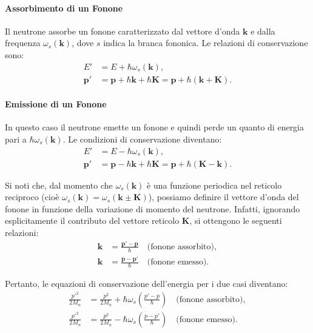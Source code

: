 \paragraph{Assorbimento di un Fonone}
Il neutrone assorbe un fonone caratterizzato dal vettore d'onda $\mathbf{k}$ e dalla frequenza $\omega_s(\mathbf{k})$, dove $s$ indica la branca fononica. Le relazioni di conservazione sono:
\[
\begin{split}
E' &= E + \hbar \omega_s(\mathbf{k}), \\
\mathbf{p}' &= \mathbf{p} + \hbar \mathbf{k} + \hbar \mathbf{K} = \mathbf{p} + \hbar \left( \mathbf{k} + \mathbf{K} \right).
\end{split}
\]

\paragraph{Emissione di un Fonone}
In questo caso il neutrone emette un fonone e quindi perde un quanto di energia pari a $\hbar \omega_s(\mathbf{k})$. Le condizioni di conservazione diventano:
\[
\begin{split}
E' &= E - \hbar \omega_s(\mathbf{k}), \\
\mathbf{p}' &= \mathbf{p} - \hbar \mathbf{k} + \hbar \mathbf{K} = \mathbf{p} + \hbar \left( \mathbf{K} - \mathbf{k} \right).
\end{split}
\]

Si noti che, dal momento che $\omega_s(\mathbf{k})$ è una funzione periodica nel reticolo reciproco (cioè $\omega_s(\mathbf{k}) = \omega_s(\mathbf{k} \pm \mathbf{K})$), possiamo definire il vettore d'onda del fonone in funzione della variazione di momento del neutrone. Infatti, ignorando esplicitamente il contributo del vettore reticolo $\mathbf{K}$, si ottengono le seguenti relazioni:
\[
\begin{split}
\mathbf{k} &= \frac{\mathbf{p}' - \mathbf{p}}{\hbar} \quad \text{(fonone assorbito)}, \\
\mathbf{k} &= \frac{\mathbf{p} - \mathbf{p}'}{\hbar} \quad \text{(fonone emesso)}.
\end{split}
\]

Pertanto, le equazioni di conservazione dell'energia per i due casi diventano:
\[
\begin{split}
\frac{p'^2}{2M_n} &= \frac{p^2}{2M_n} + \hbar \omega_s\!\left(\frac{p'-p}{\hbar}\right) \quad \text{(fonone assorbito)},\\[1mm]
\frac{p'^2}{2M_n} &= \frac{p^2}{2M_n} - \hbar \omega_s\!\left(\frac{p-p'}{\hbar}\right) \quad \text{(fonone emesso)}.
\end{split}
\]

